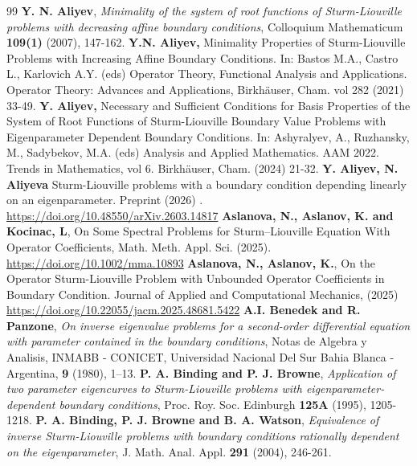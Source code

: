 \documentclass[10pt,a4paper]{amsart}
\numberwithin{equation}{section}
\begin{document}
\begin{thebibliography}{99}
 \textbf{Y. N. Aliyev}, \textit{Minimality of the system of root functions of Sturm-Liouville problems with decreasing affine boundary conditions}, Colloquium Mathematicum \textbf{109(1)} (2007), 147-162.
 \textbf{Y.N. Aliyev,} Minimality Properties of Sturm-Liouville Problems with Increasing Affine Boundary Conditions. In: Bastos M.A., Castro L., Karlovich A.Y. (eds) Operator Theory, Functional Analysis and Applications. Operator Theory: Advances and Applications, Birkhäuser, Cham. vol 282 (2021) 33-49.
 \textbf{Y. Aliyev,} Necessary and Sufficient Conditions for Basis Properties of the System of Root Functions of Sturm-Liouville Boundary Value Problems with Eigenparameter Dependent Boundary Conditions. In: Ashyralyev, A., Ruzhansky, M., Sadybekov, M.A. (eds) Analysis and Applied Mathematics. AAM 2022. Trends in Mathematics, vol 6. Birkhäuser, Cham. (2024) 21-32.
 \textbf{Y. Aliyev, N. Aliyeva} Sturm-Liouville problems with a boundary condition depending linearly on an eigenparameter. Preprint (2026) . \url{https://doi.org/10.48550/arXiv.2603.14817}
 \textbf{Aslanova, N., Aslanov, K. and Kocinac, L}, On Some Spectral Problems for Sturm–Liouville Equation With Operator Coefficients, Math. Meth. Appl. Sci. \textbf{} (2025). \url{https://doi.org/10.1002/mma.10893}
 \textbf{Aslanova, N., Aslanov, K.}, On the Operator Sturm-Liouville Problem with Unbounded Operator Coefficients in Boundary Condition. Journal of Applied and Computational Mechanics, (2025) \url{https://doi.org/10.22055/jacm.2025.48681.5422}
 \textbf{A.I. Benedek and R. Panzone}, \textit{On inverse eigenvalue problems for a second-order differential equation with parameter contained in the boundary conditions}, Notas de Algebra y Analisis, INMABB - CONICET, Universidad Nacional Del Sur Bahia Blanca - Argentina, \textbf{9} (1980), 1–13.
 \textbf{P. A. Binding and P. J. Browne}, \textit{Application of two parameter eigencurves to Sturm-Liouville problems with eigenparameter-dependent boundary conditions}, Proc. Roy. Soc. Edinburgh \textbf{125A} (1995), 1205-1218.
 \textbf{P. A. Binding, P. J. Browne and B. A. Watson}, \textit{Equivalence of inverse Sturm-Liouville problems with boundary conditions rationally dependent on the eigenparameter}, J. Math. Anal. Appl. \textbf{291} (2004), 246-261.

\end{thebibliography}
\end{document}
